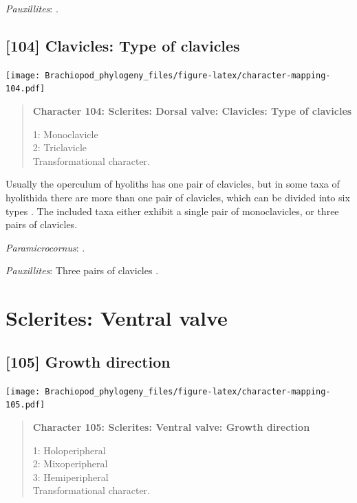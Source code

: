 \documentclass[openany]{book}
\begin{document}
\hypertarget{Pauxillites-coding-103}{}
\emph{Pauxillites}: \citet{Marek1966}.

\subsection*{{[}104{]} Clavicles: Type of
clavicles}\label{clavicles-type-of-clavicles}

\texttt{[image: Brachiopod\_phylogeny\_files/figure-latex/character-mapping-104.pdf]}

\begin{quote}
\textbf{Character 104: Sclerites: Dorsal valve: Clavicles: Type of
clavicles}

1: Monoclavicle\\
2: Triclavicle\\
Transformational character.
\end{quote}

Usually the operculum of hyoliths has one pair of clavicles, but in some
taxa of hyolithida there are more than one pair of clavicles, which can
be divided into six types \citep{Marek1967}. The included taxa either
exhibit a single pair of monoclavicles, or three pairs of clavicles.

\hypertarget{Paramicrocornus-coding-104}{}
\emph{Paramicrocornus}: \citet{Zhang2018Ahyolithid}.

\hypertarget{Pauxillites-coding-104}{}
\emph{Pauxillites}: Three pairs of clavicles \citep{Marek1966}.

\section{Sclerites: Ventral valve}\label{sclerites-ventral-valve}

\subsection*{{[}105{]} Growth direction}\label{growth-direction-1}

\texttt{[image: Brachiopod\_phylogeny\_files/figure-latex/character-mapping-105.pdf]}

\begin{quote}
\textbf{Character 105: Sclerites: Ventral valve: Growth direction}

1: Holoperipheral\\
2: Mixoperipheral\\
3: Hemiperipheral\\
Transformational character.
\end{quote}
\end{document}
